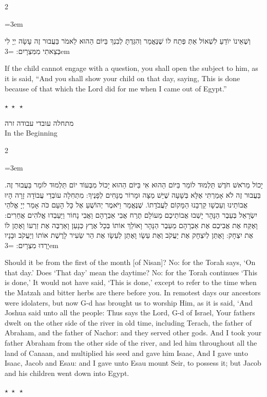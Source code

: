 \documentclass[11pt, openany]{book}
\newcommand{\sederdivider}{%
  \par\vspace{6pt}
  \begin{center}
    \textcolor{sedergold}{\large$\star\;\star\;\star$}
  \end{center}
  \par\vspace{6pt}
}
\newenvironment{bilingual}{%
  \par\vspace{4pt}%
  \begin{paracol}{2}%
}{%
  \end{paracol}%
  \par\vspace{2pt}%
}
\newenvironment{hebrewcol}{%
  \switchcolumn[1]%
  \begingroup
  \RTL
  \hebrewfont\large
  \setstretch{1.4}%
  \emergencystretch=3em
  \tolerance=9999
  \parindent=0pt\relax
}{%
  \endRTL
  \endgroup
}
\newenvironment{englishcol}{%
  \switchcolumn[0]%
  \begingroup
  \setstretch{1.4}%
  \emergencystretch=3em
  \tolerance=9999
  \normalsize
  \rightskip=0.12in\relax
}{%
  \endgroup
}
\newcommand{\subsedertitle}[2]{%
  \par\vspace{8pt}
  \begin{center}
    {\kidssteptitlefonthebrew\textcolor{sederblue}{\beginR #1\endR}}\\[3pt]
    {\kidssteptitlefont\normalsize\textcolor{sederblue}{#2}}
  \end{center}
  \par\vspace{3pt}
}
\begin{document}
\begin{bilingual}
\begin{hebrewcol}
וְשֶׁאֵינוֹ יוֹדֵעַ לִשְׁאוֹל אַתְּ פְּתַח לוֹ שֶׁנֶּאֱמַר וְהִגַּדְתָּ לְבִנְךָ בַּיּוֹם הַהוּא לֵאמֹר בַּעֲבוּר זֶה עָשָׂה יְיָ לִי בְּצֵאתִי מִמִּצְרָיִם:
\end{hebrewcol}
\begin{englishcol}
If the child cannot engage with a question, you shall open the subject to him, as it is said, ``And you shall show your child on that day, saying, This is done because of that which the Lord did for me when I came out of Egypt.''
\end{englishcol}
\end{bilingual}

\sederdivider

\subsedertitle{מתחלה עובדי עבודה זרה}{In the Beginning}

\begin{bilingual}
\begin{hebrewcol}
יָכוֹל מֵרֹאשׁ חֹדֶשׁ תַּלְמוּד לוֹמַר בַּיּוֹם הַהוּא אִי בַּיּוֹם הַהוּא יָכוֹל מִבְּעוֹד יוֹם תַּלְמוּד לוֹמַר בַּעֲבוּר זֶה. בַּעֲבוּר זֶה לֹא אָמַרְתִּי אֶלָּא בְּשָׁעָה שֶׁיֵּשׁ מַצָּה וּמָרוֹר מֻנָּחִים לְפָנֶיךָ:
מִתְּחִלָה עוֹבְדֵי עֲבוֹדָה זָרָה הָיוּ אֲבוֹתֵינוּ וְעַכְשָׁו קֵרְבָנוּ הַמָּקוֹם לַעֲבֹדָתוֹ. שֶׁנֶּאֱמַר וַיֹּאמֶר יְהוֹשֻׁעַ אֶל כָּל הָעָם כֹּה אָמַר יְיָ אֱלֹהֵי יִשְׂרָאֵל בְּעֵבֶר הַנָּהָר יָשְׁבוּ אֲבוֹתֵיכֶם מֵעוֹלָם תֶּרַח אֲבִי אַבְרָהָם וַאֲבִי נָחוֹר וַיַּעַבְדוּ אֱלֹהִים אֲחֵרִים:
וָאֶקַּח אֶת אֲבִיכֶם אֶת אַבְרָהָם מֵעֵבֶר הַנָּהָר וָאוֹלֵךְ אוֹתוֹ בְּכָל אֶרֶץ כְּנָעַן וָאַרְבֶּה אֶת זַרְעוֹ וָאֶתֶּן לוֹ אֶת יִצְחָק: וָאֶתֵּן לְיִצְחָק אֶת יַעֲקֹב וְאֶת עֵשָׂו וָאֶתֵּן לְעֵשָׂו אֶת הַר שֵׂעִיר לָרֶשֶׁת אוֹתוֹ וְיַעֲקֹב וּבָנָיו יָרְדוּ מִצְרָיִם:
\end{hebrewcol}
\begin{englishcol}
Should it be from the first of the month [of Nisan]? No: for the Torah says, `On that day.' Does `That day' mean the daytime? No: for the Torah continues `This is done,' It would not have said, `This is done,' except to refer to the time when the Matzah and bitter herbs are there before you.
In remotest days our ancestors were idolaters, but now G-d has brought us to worship Him, as it is said, `And Joshua said unto all the people: Thus says the Lord, G-d of Israel, Your fathers dwelt on the other side of the river in old time, including Terach, the father of Abraham, and the father of Nachor: and they served other gods.
And I took your father Abraham from the other side of the river, and led him throughout all the land of Canaan, and multiplied his seed and gave him Isaac, And I gave unto Isaac, Jacob and Esau: and I gave unto Esau mount Seir, to possess it; but Jacob and his children went down into Egypt.
\end{englishcol}
\end{bilingual}
\sederdivider
\end{document}
